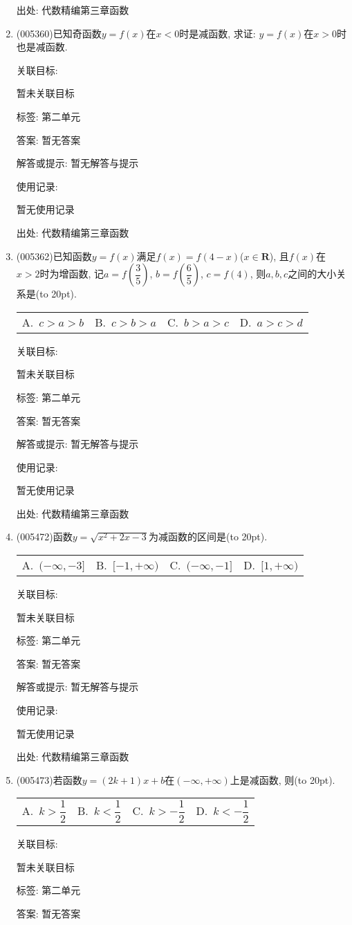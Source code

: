\documentclass[10pt,a4paper]{article}
\newcommand{\bracket}[1]{(\hbox to #1pt{})}
\newcommand{\fourch}[4]{\par\begin{tabular}{p{.23\textwidth}p{.23\textwidth}p{.23\textwidth}p{.23\textwidth}}
A.~#1 &B.~#2& C.~#3& D.~#4
\end{tabular}}
\begin{document}
\begin{enumerate}[1.]
出处: 代数精编第三章函数
\item { (005360)}已知奇函数$y=f(x)$在$x<0$时是减函数, 求证: $y=f(x)$在$x>0$时也是减函数.


关联目标:

暂未关联目标



标签: 第二单元

答案: 暂无答案

解答或提示: 暂无解答与提示

使用记录:

暂无使用记录


出处: 代数精编第三章函数
\item { (005362)}已知函数$y=f(x)$满足$f(x)=f(4-x)$($x\in \mathbf{R}$), 且$f(x)$在$x>2$时为增函数, 记$a=f(\dfrac 35)$, $b=f(\dfrac 65)$, $c=f(4)$, 则$a,b,c$之间的大小关系是\bracket{20}.
\fourch{$c>a>b$}{$c>b>a$}{$b>a>c$}{$a>c>d$}


关联目标:

暂未关联目标



标签: 第二单元

答案: 暂无答案

解答或提示: 暂无解答与提示

使用记录:

暂无使用记录


出处: 代数精编第三章函数
\item { (005472)}函数$y=\sqrt {x^2+2x-3}$为减函数的区间是\bracket{20}.
\fourch{$(-\infty ,-3]$}{$[-1,+\infty)$}{$(-\infty ,-1]$}{$[1,+\infty)$}


关联目标:

暂未关联目标



标签: 第二单元

答案: 暂无答案

解答或提示: 暂无解答与提示

使用记录:

暂无使用记录


出处: 代数精编第三章函数
\item { (005473)}若函数$y=(2k+1)x+b$在$(-\infty,+\infty)$上是减函数, 则\bracket{20}.
\fourch{$k>\dfrac 12$}{$k<\dfrac 12$}{$k>-\dfrac 12$}{$k<-\dfrac 12$}


关联目标:

暂未关联目标



标签: 第二单元

答案: 暂无答案


\end{enumerate}
\end{document}
